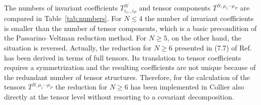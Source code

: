 \documentclass[preprint,sort&compress,12pt]{elsarticle}
\renewcommand{\Green}{\textcolor{mygreen}}
\def\refta#1{\mbox{Table~\ref{#1}}}
\def\citere#1{\mbox{Ref.~\cite{#1}}}
\newcommand{\collier}{{\sc Collier}}
\begin{document}

The numbers of invariant coefficients $T^N_{i_1\ldots i_P}$ and tensor
\sloppy
components $T^{N,\mu_1\cdots\mu_{P}}$ 
are compared in \refta{tab:numbers}. For $N\le 4$ the number of invariant coefficients
is smaller than the number of tensor components, which is a basic
precondition of the Passarino--Veltman reduction method. For $N\ge 5$,
on the other hand, the situation is reversed.
Actually, the reduction for $N\ge 6$ presented in (7.7) of
\citere{Denner:2005nn} has been derived in terms of full
tensors. Its translation to tensor coefficients requires a
symmetrization and the resulting coefficients are not unique because
of the redundant number of tensor structures. Therefore, for the
calculation of the tensors $T^{N,\mu_1\cdots\mu_{P}}$ the reduction
for $N\ge 6$ has been implemented in {\collier} also directly at the
tensor level without resorting to a covariant decomposition.
\end{document}
